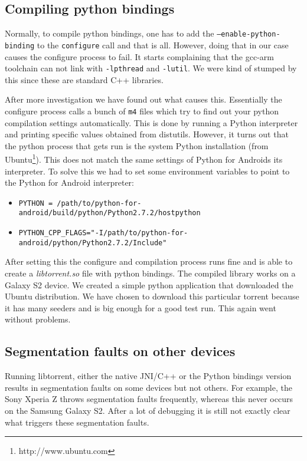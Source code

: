 		\subsection{Compiling python bindings}
			Normally, to compile python bindings, one has to add the \texttt{--enable-python-binding} to the \texttt{configure} call and that is all. However, doing that in our case causes the configure process to fail. It starts complaining that the gcc-arm toolchain can not link with \texttt{-lpthread} and \texttt{-lutil}. We were kind of stumped by this since these are standard C++ libraries.
			
			After more investigation we have found out what causes this. Essentially the configure process calls a bunch of \texttt{m4} files which try to find out your python compilation settings automatically. This is done by running a Python interpreter and printing specific values obtained from distutils. However, it turns out that the python process that gets run is the system Python installation (from Ubuntu\footnote{http://www.ubuntu.com}). This does not match the same settings of Python for Androids its interpreter. To solve this we had to set some environment variables to point to the Python for Android interpreter:
			
			\begin{itemize}
				\item \texttt{PYTHON = /path/to/python-for-android/build/python/Python2.7.2/hostpython}
				\item \texttt{PYTHON\_CPP\_FLAGS="-I/path/to/python-for-android/python/Python2.7.2/Include"}
			\end{itemize}
			
			After setting this the configure and compilation process runs fine and is able to create a \emph{libtorrent.so} file with python bindings. The compiled library works on a Galaxy S2 device. We created a simple python application that downloaded the Ubuntu distribution. We have chosen to download this particular torrent because it has many seeders and is big enough for a good test run. This again went without problems.
			
		\subsection{Segmentation faults on other devices}
			Running libtorrent, either the native JNI/C++ or the Python bindings version results in segmentation faults on some devices but not others. For example, the Sony Xperia Z throws segmentation faults frequently, whereas this never occurs on the Samsung Galaxy S2.  After a lot of debugging it is still not exactly clear what triggers these segmentation faults.
			
